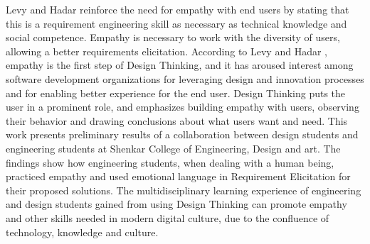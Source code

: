 \documentclass[conference]{IEEEtran}
\begin{document}

Levy and Hadar \cite{DBLP:conf/re/LevyH18} reinforce the need for empathy with end users by stating that this is a requirement engineering skill as necessary as technical knowledge and social competence. Empathy is necessary to work with the diversity of users, allowing a better requirements elicitation. According to Levy and Hadar \cite{DBLP:conf/re/LevyH18}, empathy is the first step of Design Thinking, and it has aroused interest among software development organizations for leveraging design and innovation processes and for enabling better experience for the end user. Design Thinking puts the user in a prominent role, and emphasizes building empathy with users, observing their behavior and drawing conclusions about what users want and need. This work presents preliminary results of a collaboration between design students and engineering students at Shenkar College of Engineering, Design and art. The findings show how engineering students, when dealing with a human being, practiced empathy and used emotional language in Requirement Elicitation for their proposed solutions. The multidisciplinary learning experience of engineering and design students gained from using Design Thinking can promote empathy and other skills needed in modern digital culture, due to the confluence of technology, knowledge and culture.
\end{document}
